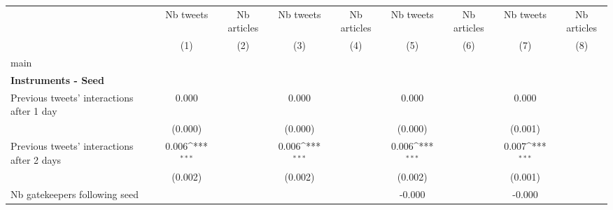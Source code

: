 {
\def\sym#1{\ifmmode^{#1}\else\(^{#1}\)\fi}
\begin{tabular}{l*{8}{c}}
\hline\hline
                    &\multicolumn{1}{c}{Nb tweets}&\multicolumn{1}{c}{Nb articles}&\multicolumn{1}{c}{Nb tweets}&\multicolumn{1}{c}{Nb articles}&\multicolumn{1}{c}{Nb tweets}&\multicolumn{1}{c}{Nb articles}&\multicolumn{1}{c}{Nb tweets}&\multicolumn{1}{c}{Nb articles}\\\cmidrule(lr){2-2}\cmidrule(lr){3-3}\cmidrule(lr){4-4}\cmidrule(lr){5-5}\cmidrule(lr){6-6}\cmidrule(lr){7-7}\cmidrule(lr){8-8}\cmidrule(lr){9-9}
                    &\multicolumn{1}{c}{(1)}         &\multicolumn{1}{c}{(2)}         &\multicolumn{1}{c}{(3)}         &\multicolumn{1}{c}{(4)}         &\multicolumn{1}{c}{(5)}         &\multicolumn{1}{c}{(6)}         &\multicolumn{1}{c}{(7)}         &\multicolumn{1}{c}{(8)}         \\
\hline
main                &                     &                     &                     &                     &                     &                     &                     &                     \\
\textbf{Instruments - Seed}&                     &                     &                     &                     &                     &                     &                     &                     \\
Previous tweets' interactions after 1 day&       0.000         &                     &       0.000         &                     &       0.000         &                     &       0.000         &                     \\
                    &     (0.000)         &                     &     (0.000)         &                     &     (0.000)         &                     &     (0.001)         &                     \\
Previous tweets' interactions after 2 days&       0.006\sym{***}&                     &       0.006\sym{***}&                     &       0.006\sym{***}&                     &       0.007\sym{***}&                     \\
                    &     (0.002)         &                     &     (0.002)         &                     &     (0.002)         &                     &     (0.001)         &                     \\
Nb gatekeepers following seed&                     &                     &                     &                     &      -0.000         &                     &      -0.000         &                     \\

\end{tabular}}
